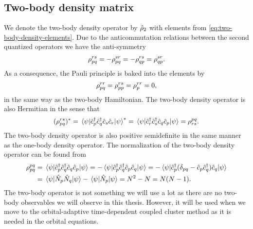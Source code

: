         \subsection{Two-body density matrix}
            We denote the two-body density operator by $\hat{\rho}_2$ with
            elements from \autoref{eq:two-body-density-elements}.
            Due to the anticommutation relations between the second quantized
            operators we have the anti-symmetry
            \begin{align}
                \rho^{rs}_{pq}
                = -\rho^{sr}_{pq}
                = -\rho^{rs}_{qp}
                = \rho^{sr}_{qp}.
            \end{align}
            As a consequence, the Pauli principle is baked into the elements by
            \begin{align}
                \rho^{rr}_{pq}
                = \rho^{rs}_{pp}
                = \rho^{rr}_{p}
                = 0,
            \end{align}
            in the same way as the two-body Hamiltonian.
            The two-body density operator is also Hermitian in the sense that
            \begin{align}
                (\rho^{rs}_{pq})^{*}
                = \mel{\psi}{\hat{c}_{p}^{\dagger}\hat{c}_{q}^{\dagger}\hat{c}_{s}\hat{c}_{r}}{\psi}^{*}
                = \mel{\psi}{\hat{c}_{r}^{\dagger}\hat{c}_{s}^{\dagger}\hat{c}_{q}\hat{c}_{p}}{\psi}
                = \rho^{pq}_{rs}.
            \end{align}
            The two-body density operator is also positive semidefinite in the
            same manner as the one-body density operator.
            The normalization of the two-body density operator can be found from
            \begin{align}
                \rho^{pq}_{pq}
                &= \mel{\psi}{\hat{c}_{p}^{\dagger}\hat{c}_{q}^{\dagger}\hat{c}_{q}\hat{c}_{p}}{\psi}
                = -\mel{\psi}{\hat{c}_{p}^{\dagger}\hat{c}_{q}^{\dagger}\hat{c}_{p}\hat{c}_{q}}{\psi}
                = -\mel{\psi}{
                    \hat{c}_{p}^{\dagger}(\delta_{pq} - \hat{c}_{p}\hat{c}_{q}^{\dagger})\hat{c}_{q}
                }{\psi}
                \\
                &=
                \mel{\psi}{\hat{N}_{p}\hat{N}_{q}}{\psi}
                - \mel{\psi}{\hat{N}_{p}}{\psi}
                = N^2 - N
                = N(N - 1).
            \end{align}
            The two-body operator is not something we will use a lot as there
            are no two-body observables we will observe in this thesis.
            However, it will be used when we move to the orbital-adaptive
            time-dependent coupled cluster method as it is needed in the orbital
            equations.


